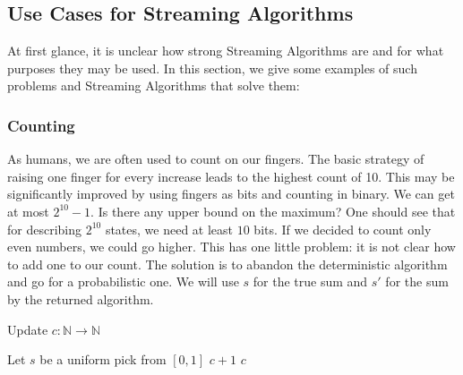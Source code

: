 \subsection{Use Cases for Streaming Algorithms}

At first glance, it is unclear how strong Streaming Algorithms are and for what purposes they may be used. In this section, we give some examples of such problems and Streaming Algorithms that solve them: 

\subsubsection{Counting}
As humans, we are often used to count on our fingers. The basic strategy of raising one finger for every increase leads to the highest count of 10. This may be significantly improved by using fingers as bits and counting in binary. We can get at most $2^{10} - 1$. Is there any upper bound on the maximum?
One should see that for describing $2^{10}$ states, we need at least $10$ bits.
If we decided to count only even numbers, we could go higher. This has one little problem: it is not clear how to add one to our count. The solution is to abandon the deterministic algorithm and go for a probabilistic one.  We will use $s$ for the true sum and $s'$ for the sum by the returned algorithm. 

\begin{algorithm}
\caption{Update $c : \mathbb{N} \to \mathbb{N}$}
\label{Update}
\begin{algorithmic}[1]
    \State Let $s$ be a uniform pick from $[0,1]$
        \State \Return $c + 1$
    \Else
        \State \Return $c$
    \EndIf
\EndProcedure
\end{algorithmic}
\end{algorithm}

